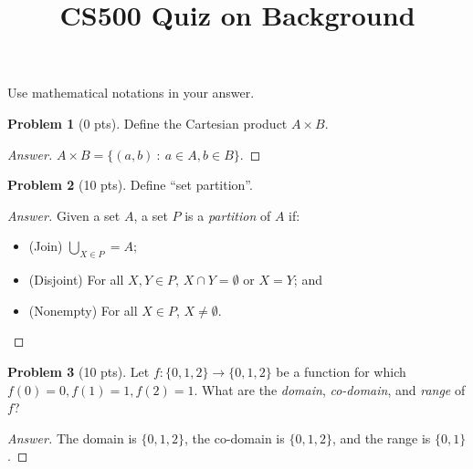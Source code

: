 \documentclass[11pt,a4paper,oneside,microtype,nokorean]{oblivoir}
\theoremstyle{definition}
\newtheorem{problem}{Problem}
\begin{document}
\title{CS500 Quiz on Background}
\maketitle

\noindent Use mathematical notations in your answer.

\begin{problem}[0 pts]
  Define the Cartesian product $A \times B$.
\end{problem}
\begin{proof}[Answer]
  $A \times B = \{(a,b)~:~a \in A, b \in B\}$.
\end{proof}


\begin{problem}[10 pts]
  Define ``set partition''.
\end{problem}
\begin{proof}[Answer]
  Given a set $A$, a set $P$ is a \emph{partition} of $A$ if:
  \begin{itemize}
  \item (Join) $\bigcup_{X \in P} = A$;
  \item (Disjoint) For all $X, Y \in P$, $X \cap Y = \emptyset$ or $X = Y$; and
  \item (Nonempty) For all $X \in P$, $X \neq \emptyset$.
  \end{itemize}
\end{proof}


\begin{problem}[10 pts]
  Let $f: \{0,1,2\} \to \{0,1,2\}$ be a function for which $f(0) = 0, f(1) = 1, f(2) = 1$.  What are
  the \emph{domain}, \emph{co-domain}, and \emph{range} of $f$?
\end{problem}
\begin{proof}[Answer]
  The domain is $\{0,1,2\}$, the co-domain is $\{0,1,2\}$, and the range is $\{0,1\}$.
\end{proof}
\end{document}
